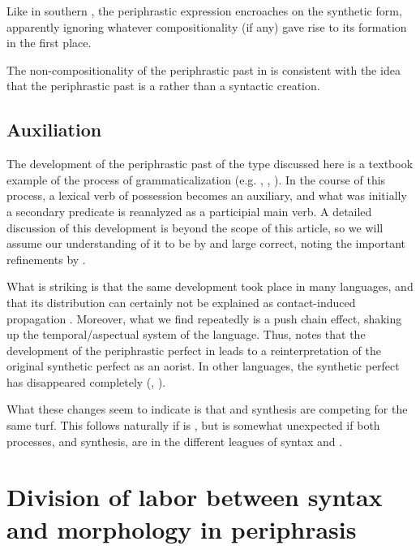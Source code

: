 \documentclass[output=paper]{LSP/langsci}
\begin{document}
\noindent Like in southern , the periphrastic expression encroaches on the synthetic form, apparently ignoring whatever compositionality  (if any) gave rise to its formation in the first place.

The non-compositionality of the periphrastic past in  is consistent with the idea that the periphrastic past is a  rather than a syntactic creation.

\subsection{Auxiliation}

The development of the periphrastic past  of the type discussed here is a textbook example of the process of grammaticalization (e.g. \citealt[57]{HopperTraugott1993}, \citealt[182f]{HarrisCampbell1995}, \citealt[40f]{Kuteva2001}). In the course of this process, a lexical verb of possession becomes an auxiliary, and what was initially a secondary predicate is reanalyzed as a participial main verb. A detailed discussion of this development is beyond the scope of this article, so we will assume our understanding of it to be by and large correct, noting the important refinements by \citet[86f]{Benveniste1968}.

What is striking is that the same development took place in many languages, and that its distribution can certainly not be explained as contact-induced propagation \citep[87--88]{Vendryes1937}. Moreover, what we find repeatedly is a push chain effect, shaking up the temporal/aspectual system of the language. Thus, \citet[88]{Benveniste1968} notes that the development of the periphrastic perfect in  leads to a reinterpretation of the original synthetic perfect as an aorist. In other languages, the synthetic perfect has disappeared completely (\citealt[90]{Vendryes1937}, \citealt[149f]{Meillet1921}).

What these changes seem to indicate is that  and synthesis are competing for the same turf. This follows naturally if  is , but is somewhat unexpected if both processes,  and synthesis, are in the different leagues of syntax and .

\section{Division of labor between syntax and morphology in periphrasis}\label{sec:zwart:3} 
\end{document}
